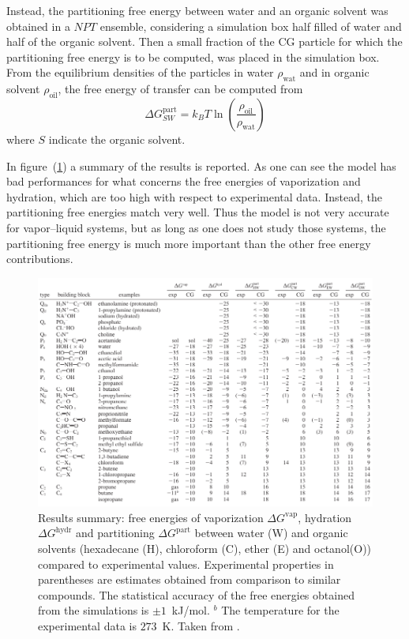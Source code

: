 Instead, the partitioning free energy between water and an organic solvent was obtained in a $NPT$ ensemble, considering a simulation box half filled of water and half of the organic solvent. Then a small fraction of the \ac{CG} particle for which the partitioning free energy is to be computed, was placed in the simulation box. From the equilibrium densities of the particles in water $\rho_{\text{wat}}$ and in organic solvent $\rho_{\text{oil}}$, the free energy of transfer can be computed from
\begin{equation*}
	\Delta G_{SW}^{\text{part}} = k_B T \ln \left ( \frac{\rho_{\text{oil}}}{\rho_{\text{wat}}}\right )
\end{equation*}
where $S$ indicate the organic solvent.

In figure~(\ref{fig:martiniTarget}) a summary of the results is reported. As one can see the model has bad performances for what concerns the free energies of vaporization and hydration, which are too high with respect to experimental data. Instead, the partitioning free energies match very well. Thus the model is not very accurate for vapor--liquid systems, but as long as one does not study those systems, the partitioning free energy is much more important than the other free energy contributions.
\begin{figure}[h!t]%
	\center
	\includegraphics[width=\textwidth]{img/martiniTarget}%
	\caption{Results summary: free energies of vaporization $\Delta G^\text{vap}$, hydration $\Delta G^\text{hydr}$ and partitioning $\Delta G^\text{part}$ between water (W) and organic solvents (hexadecane (H), chloroform (C), ether (E) and octanol(O)) compared to experimental values. Experimental properties in parentheses are estimates obtained from comparison to similar compounds. The statistical accuracy of the free energies obtained from the simulations is $\pm 1$~kJ/mol. $^b$ The temperature for the experimental data is $273$~K. Taken from \cite{Martini}.}
	\label{fig:martiniTarget}
\end{figure}
